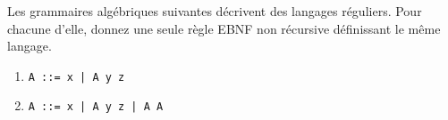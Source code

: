 
  \item Les grammaires algébriques suivantes décrivent des langages
  réguliers. Pour chacune d'elle, donnez une seule règle EBNF non
  récursive définissant le même langage.

  \begin{enumerate}

    \item \verb+A ::= x | A y z+

    \item \verb+A ::= x | A y z | A A+

  \end{enumerate}
